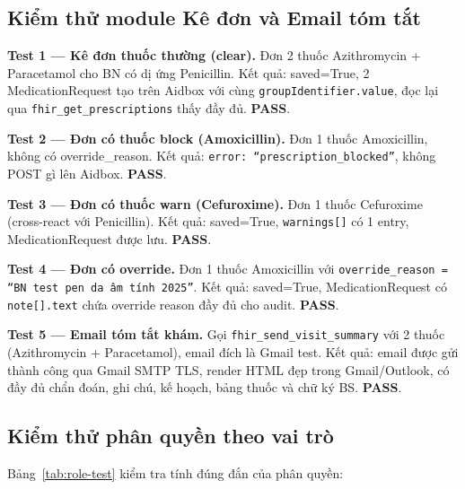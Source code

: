 \documentclass[a4paper,13pt,3p,twoside,openany]{report}
\theoremstyle{definition}
\theoremstyle{remark}
\theoremstyle{definition}
\let\ORIGsubsection\subsection
\renewcommand{\subsection}{\needspace{3\baselineskip}\ORIGsubsection}
\begin{document}
\subsection{Kiểm thử module Kê đơn và Email tóm tắt}

\textbf{Test 1 --- Kê đơn thuốc thường (clear).} Đơn 2 thuốc Azithromycin + Paracetamol cho BN có dị ứng Penicillin. Kết quả: saved=True, 2 MedicationRequest tạo trên Aidbox với cùng \texttt{groupIdentifier.value}, đọc lại qua \texttt{fhir\_get\_prescriptions} thấy đầy đủ. \textbf{PASS}.

\textbf{Test 2 --- Đơn có thuốc block (Amoxicillin).} Đơn 1 thuốc Amoxicillin, không có override\_reason. Kết quả: \texttt{error: ``prescription\_blocked''}, không POST gì lên Aidbox. \textbf{PASS}.

\textbf{Test 3 --- Đơn có thuốc warn (Cefuroxime).} Đơn 1 thuốc Cefuroxime (cross-react với Penicillin). Kết quả: saved=True, \texttt{warnings[]} có 1 entry, MedicationRequest được lưu. \textbf{PASS}.

\textbf{Test 4 --- Đơn có override.} Đơn 1 thuốc Amoxicillin với \texttt{override\_reason = ``BN test pen da âm tính 2025''}. Kết quả: saved=True, MedicationRequest có \texttt{note[].text} chứa override reason đầy đủ cho audit. \textbf{PASS}.

\textbf{Test 5 --- Email tóm tắt khám.} Gọi \texttt{fhir\_send\_visit\_summary} với 2 thuốc (Azithromycin + Paracetamol), email đích là Gmail test. Kết quả: email được gửi thành công qua Gmail SMTP TLS, render HTML đẹp trong Gmail/Outlook, có đầy đủ chẩn đoán, ghi chú, kế hoạch, bảng thuốc và chữ ký BS. \textbf{PASS}.

\subsection{Kiểm thử phân quyền theo vai trò}

Bảng~\ref{tab:role-test} kiểm tra tính đúng đắn của phân quyền:
\end{document}
